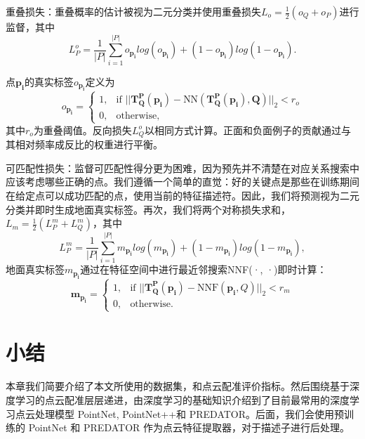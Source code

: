 重叠损失：重叠概率的估计被视为二元分类并使用重叠损失$L_o = \frac{1}{2} (o_Q + o_P)$进行监督，其中
\begin{equation}
L_P^o = \frac{1}{|P|} \sum_{i=1}^{|P|} o_{\boldsymbol{p_i}} log(o_{\boldsymbol{p_i}}) + (1 - o_{\boldsymbol{p_i}}) log(1 - o_{\boldsymbol{p_i}}).
\end{equation}

点$\boldsymbol{p_i}$的真实标签$o_{\boldsymbol{p_i}}$定义为
\begin{equation}
    o_{\boldsymbol{p_i}} =
\begin{cases}
1, & \text{if } ||\boldsymbol{T_{Q}^{P}(p_i)} - \text{NN}(\boldsymbol{T_{Q}^{P}(p_i), Q})||_2 < r_o \\
0, & \text{otherwise},
\end{cases}
\end{equation}
其中$r_o$为重叠阈值。反向损失$L_Q^o$以相同方式计算。正面和负面例子的贡献通过与其相对频率成反比的权重进行平衡。

可匹配性损失：监督可匹配性得分更为困难，因为预先并不清楚在对应关系搜索中应该考虑哪些正确的点。我们遵循一个简单的直觉：好的关键点是那些在训练期间在给定点可以成功匹配的点，使用当前的特征描述符。因此，我们将预测视为二元分类并即时生成地面真实标签。再次，我们将两个对称损失求和，$L_m = \frac{1}{2} (L_P^m + L_Q^m)$，其中
\begin{equation}
L_P^m = \frac{1}{|P|} \sum_{i=1}^{|P|} m_{\boldsymbol{p_i}} log(m_{\boldsymbol{p_i}}) + (1 - m_{\boldsymbol{p_i}}) log(1 - m_{\boldsymbol{p_i}}),
\end{equation}
地面真实标签$m_{\boldsymbol{p_i}}$通过在特征空间中进行最近邻搜索NNF(·, ·)即时计算：
\begin{equation}
\boldsymbol{m_{\boldsymbol{p_i}}} =
\begin{cases}
1, & \text{if } ||\boldsymbol{T_{Q}^{P}({\boldsymbol{p_i}})} - \text{NNF}(\boldsymbol{p_i}, Q)||_2 < r_m \\
0, & \text{otherwise}.
\end{cases}
\end{equation}

\section{小结}
本章我们简要介绍了本文所使用的数据集，和点云配准评价指标。然后围绕基于深度学习的点云配准层层递进，由深度学习的基础知识介绍到了目前最常用的深度学习点云处理模型 PointNet, PointNet++和 PREDATOR。后面，我们会使用预训练的 PointNet 和 PREDATOR 作为点云特征提取器，对于描述子进行后处理。
